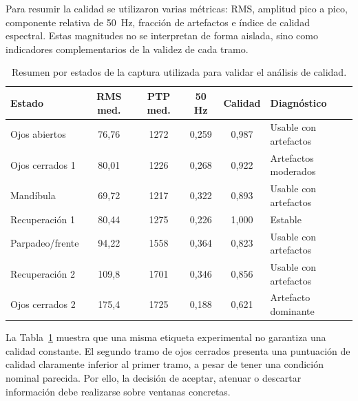 Para resumir la calidad se utilizaron varias métricas: RMS, amplitud pico a pico, componente relativa de \SI{50}{\hertz}, fracción de artefactos e índice de calidad espectral. Estas magnitudes no se interpretan de forma aislada, sino como indicadores complementarios de la validez de cada tramo.

\begin{table}[!htbp]
    \centering
    \small
    \caption{Resumen por estados de la captura utilizada para validar el análisis de calidad.}
    \label{tab:validacion_calidad_estados}
    \begin{tabular}{p{} c c c c p{}}
        \hline
        \textbf{Estado} & \textbf{RMS med.} & \textbf{PTP med.} & \textbf{50 Hz} & \textbf{Calidad} & \textbf{Diagnóstico} \\
        \hline
        Ojos abiertos & 76,76 & 1272 & 0,259 & 0,987 & Usable con artefactos \\
        Ojos cerrados 1 & 80,01 & 1226 & 0,268 & 0,922 & Artefactos moderados \\
        Mandíbula & 69,72 & 1217 & 0,322 & 0,893 & Usable con artefactos \\
        Recuperación 1 & 80,44 & 1275 & 0,226 & 1,000 & Estable \\
        Parpadeo/frente & 94,22 & 1558 & 0,364 & 0,823 & Usable con artefactos \\
        Recuperación 2 & 109,8 & 1701 & 0,346 & 0,856 & Usable con artefactos \\
        Ojos cerrados 2 & 175,4 & 1725 & 0,188 & 0,621 & Artefacto dominante \\
        \hline
    \end{tabular}
\end{table}

La Tabla~\ref{tab:validacion_calidad_estados} muestra que una misma etiqueta experimental no garantiza una calidad constante. El segundo tramo de ojos cerrados presenta una puntuación de calidad claramente inferior al primer tramo, a pesar de tener una condición nominal parecida. Por ello, la decisión de aceptar, atenuar o descartar información debe realizarse sobre ventanas concretas.

